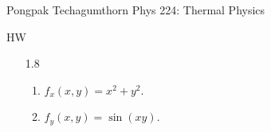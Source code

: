 \documentclass{article}
\begin{document}
\large %
{\Large Pongpak Techagumthorn
\hfill Phys 224: Thermal Physics}
\begin{center}
{\Large
HW
}
\end{center}
\vspace{0.1in}
\begin{enumerate}
    \item [1.8]
    \begin{enumerate}
        \item $f_x(x,y) = x^2+y^2$.
        \item $f_y(x,y) = \sin(xy)$.
    \end{enumerate}
    \vspace{0.1in}

\end{enumerate}
\end{document}
